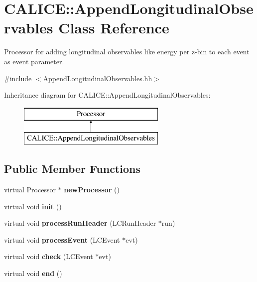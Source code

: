 \section{C\-A\-L\-I\-C\-E\-:\-:Append\-Longitudinal\-Observables Class Reference}
\label{classCALICE_1_1AppendLongitudinalObservables}


Processor for adding longitudinal observables like energy per z-\/bin to each event as event parameter.  




{\ttfamily \#include $<$Append\-Longitudinal\-Observables.\-hh$>$}

Inheritance diagram for C\-A\-L\-I\-C\-E\-:\-:Append\-Longitudinal\-Observables\-:\begin{figure}[H]
\begin{center}
\leavevmode
\includegraphics[height=2.000000cm]{classCALICE_1_1AppendLongitudinalObservables}
\end{center}
\end{figure}
\subsection*{Public Member Functions}
\begin{DoxyCompactItemize}
\item 
virtual Processor $\ast$ {\bfseries new\-Processor} ()\label{classCALICE_1_1AppendLongitudinalObservables_a184a5fed8c1f9e5a4dbc95f6fdb14719}

\item 
virtual void {\bf init} ()
\item 
virtual void {\bf process\-Run\-Header} (L\-C\-Run\-Header $\ast$run)
\item 
virtual void {\bf process\-Event} (L\-C\-Event $\ast$evt)
\item 
virtual void {\bfseries check} (L\-C\-Event $\ast$evt)\label{classCALICE_1_1AppendLongitudinalObservables_aecfac1c6fcaeed1f181c1e3120e0dec3}

\item 
virtual void {\bf end} ()
\end{DoxyCompactItemize}
